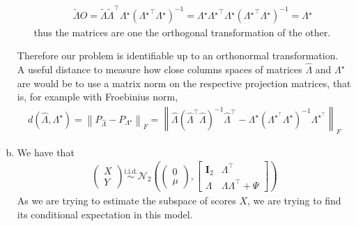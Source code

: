 \documentclass[10pt,notitlepage]{article}
\newcommand{\norm}[1]{\left\lVert #1\right\rVert}
\newcommand{\Id}{\mathbf{I}}
\begin{document}
\begin{exercise}[Solution]
\begin{enumerate}[(a)]
\begin{itemize}
                                \begin{align*}
                                    \tilde{\Lambda} O = \tilde{\Lambda} \tilde{\Lambda}^\top \Lambda{^\star} \left(\Lambda{^\star}^\top \Lambda{^\star}\right)^{-1} =\Lambda{^\star}\Lambda{^\star}^\top \Lambda{^\star}\left(\Lambda{^\star}^\top \Lambda{^\star}\right)^{-1} =  \Lambda{^\star}
                                \end{align*}
                                thus the matrices are one the orthogonal transformation of the other.
                    \end{itemize}
                    Therefore our problem is identifiable up to an orthonormal transformation.\\
                    A useful distance to measure how close columns spaces of matrices $\hat{\Lambda}$ and $\Lambda^{\star}$ are would be to use a matrix norm on the respective projection matrices, that is, for example with Froebinius norm, 
                    \begin{align*}
                        d(\hat{\Lambda}, \Lambda^{\star}) = \norm{P_{\hat{\Lambda}} - P_{\Lambda^{\star}}}_F = \norm{\hat{\Lambda}(\hat{\Lambda}^\top\hat{\Lambda})^{-1}\hat{\Lambda}^\top - \Lambda^{\star}(\Lambda^{\star^\top}\Lambda^{\star})^{-1}\Lambda^{\star^\top}}_F
                    \end{align*}
            \item  We have that 
                    \begin{align*}
                        \begin{pmatrix}
                            X \\ 
                            Y
                        \end{pmatrix} \overset{\text{i.i.d.}}{\sim} \mathcal{N}_{2}\left(
                        \begin{pmatrix}
                            0 \\ 
                            \mu
                        \end{pmatrix},
                        \begin{bmatrix}
                            \Id_2 & \Lambda^\top \\
                            \Lambda & \Lambda\Lambda^\top + \Psi
                        \end{bmatrix}
                        \right)
                    \end{align*}
                    As we are trying to estimate the subspace of scores $X$, we are trying to find its conditional expectation in this model. \\

\end{enumerate}
\end{exercise}
\end{document}
